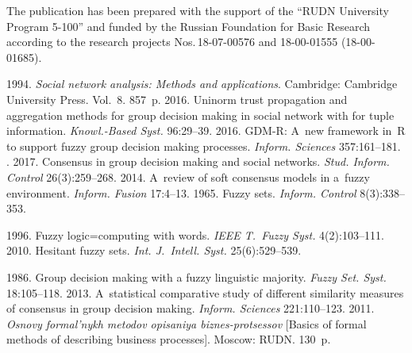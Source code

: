 \Ack
\noindent
The publication has been prepared with the support of the ``RUDN University Program 5-100'' and funded by the 
Russian Foundation for Basic Research according to the research projects
 Nos.\,18-07-00576 and 18-00-01555  
(18-00-01685).



  \begin{multicols}{2}

\renewcommand{\bibname}{\protect\rmfamily References}

{\small\frenchspacing
 {%
 \begin{thebibliography}{99}
 1994. \textit{Social network analysis: Methods and 
applications}. Cambridge: Cambridge University Press.  Vol.~8. 857~p.
 2016. Uninorm trust propagation and aggregation 
methods for group decision making in social network with for tuple information. 
\textit {Knowl.-Based Syst.} 96:29--39.
 2016. 
GDM-R: A~new framework in~R to support fuzzy group decision making processes. 
\textit{Inform. Sciences} 357:161--181.
. 
2017. Consensus in group decision making and social networks. \textit{Stud. Inform. 
Control} 26(3):259--268.
 2014. A~review 
of soft consensus models in a~fuzzy environment. \textit{Inform. Fusion} 17:4--13.
 1965. Fuzzy sets. \textit{Inform. Control} 8(3):338--353.

 1996. Fuzzy logic\;=\;computing with words. \textit{IEEE T.~Fuzzy 
Syst.} 4(2):103--111.
 2010. Hesitant fuzzy sets. \textit{Int. J.~Intell. Syst.} 
25(6):529--539.

 1986. Group decision making with a fuzzy linguistic majority. \textit{Fuzzy 
Set. Syst.} 18:105--118.
 2013. 
A~statistical comparative study of different similarity measures of consensus in group decision 
making. \textit{Inform. Sciences} 221:110--123.
 2011. 
\textit{Osnovy formal'nykh metodov opisaniya biznes-protsessov} [Basics of 
formal methods of describing business processes].  Moscow: RUDN. 130~p.


\end{thebibliography}}}
\end{multicols}
